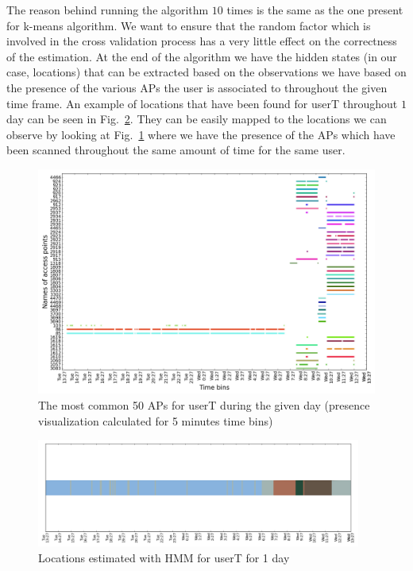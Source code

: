 The reason behind running the algorithm $10$ times is the same as the one
present for k-means algorithm. We want to ensure that the random factor which is
involved in the cross validation process has a very little effect on the
correctness of the estimation. At the end of the algorithm we have the hidden
states (in our case, locations) that can be extracted based on the observations
we have based on the presence of the various APs the user is associated to
throughout the given time frame. An example of locations that have been found
for userT throughout $1$ day can be seen in Fig.~\ref{user_6_days1_2_3_hmm}.
They can be easily mapped to the locations we can observe by looking at
Fig.~\ref{user_6_days1_2_3_APs_presence} where we have the presence of the
APs which have been scanned throughout the same amount of time for the same user.
\begin{figure}[!h]
\centering
\includegraphics[width=\textwidth]{figures/hmm/user_1_sorted_1days_no_rssi_plot.png}
\caption{The most common 50 APs for userT during the given day (presence
visualization calculated for 5 minutes time bins)}
\label{user_6_days1_2_3_APs_presence}
\end{figure}

\begin{figure}[!h]
\centering
\includegraphics[width=0.95\textwidth]{figures/hmm/user_1_hmm_locations_(5)_1days_plot.png}
\caption{Locations estimated with HMM for userT for 1 day}
\label{user_6_days1_2_3_hmm}
\end{figure}

